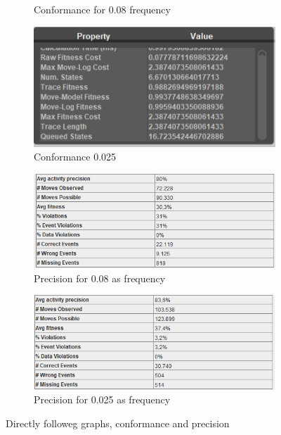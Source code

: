 \begin{figure}[h]
\begin{subfigure}{.5\textwidth}
  \caption{Conformance for 0.08 frequency}
  \label{fig:P_Conf0-08}
\end{subfigure}%
\begin{subfigure}{.5\textwidth}
  \centering
  \includegraphics[width=\linewidth]{P_Conformance0-025.PNG}
  \caption{Conformance 0.025}
  \label{fig:P_Conf0-025}
\end{subfigure}
\begin{subfigure}{.49\textwidth}
  \centering
  \includegraphics[width=\linewidth]{P_Precision0-08.PNG}
  \caption{Precision for 0.08 as frequency}
  \label{fig:P_Prec0-08}
\end{subfigure}%
\begin{subfigure}{.49\textwidth}
  \centering
  \includegraphics[width=\linewidth]{P_Precision0-025.PNG}
  \caption{Precision for 0.025 as frequency}
  \label{fig:P_Prec0-025}
\end{subfigure}
\caption{Directly followeg graphs, conformance and precision}
\label{fig:P_Direct2}
\end{figure}

